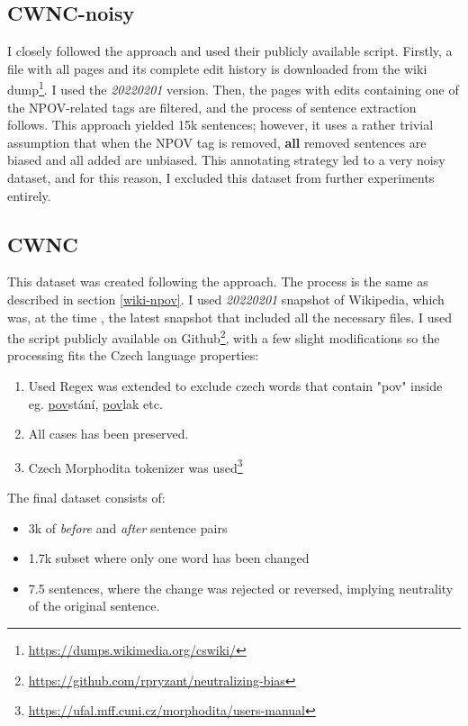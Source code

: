 \subsection{CWNC-noisy}
I closely followed the \cite{aleksandrova2019multilingual} approach and used their publicly available script. Firstly, a file with all pages and its complete edit history is downloaded from the wiki dump\footnote{\url{https://dumps.wikimedia.org/cswiki/}}. I used the \textit{20220201} version. Then, the pages with edits containing one of the NPOV-related tags are filtered, and the process of sentence extraction follows.
This approach yielded 15k sentences; however, it uses a rather trivial assumption that when the NPOV tag is removed, \textbf{all} removed sentences are biased and all added are unbiased. This annotating strategy led to a very noisy dataset, and for this reason, I excluded this dataset from further experiments entirely.


\subsection{CWNC}\label{wncs}
This dataset was created following the \cite{pryzant2020automatically} approach. The process is the same as described in section \ref{wiki-npov}. I used \textit{20220201} snapshot of Wikipedia, which was, at the time , the latest snapshot that included all the necessary files.
I used the script publicly available on Github\footnote{\url{https://github.com/rpryzant/neutralizing-bias}}, with a few slight modifications so the processing fits the Czech language properties:
\begin{enumerate}
    \item Used Regex was extended to exclude czech words that contain "pov" inside eg. \underline{pov}stání, \underline{pov}lak etc.
    \item All cases has been preserved.
    \item Czech Morphodita tokenizer was used\footnote{\url{https://ufal.mff.cuni.cz/morphodita/users-manual}}
\end{enumerate}
The final dataset consists of:
\begin{itemize}
    \item 3k of \textit{before} and \textit{after} sentence pairs
    \item 1.7k subset where only one word has been changed
    \item 7.5 sentences, where the change was rejected or reversed, implying neutrality of the original sentence.
\end{itemize}


